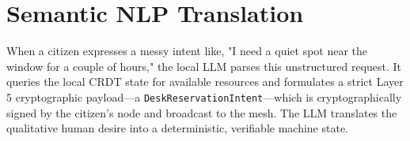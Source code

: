 \section{Semantic NLP Translation}
When a citizen expresses a messy intent like, "I need a quiet spot near the window for a couple of hours," the local LLM parses this unstructured request. It queries the local CRDT state for available resources and formulates a strict Layer 5 cryptographic payload—a \texttt{DeskReservationIntent}—which is cryptographically signed by the citizen's node and broadcast to the mesh. The LLM translates the qualitative human desire into a deterministic, verifiable machine state.

